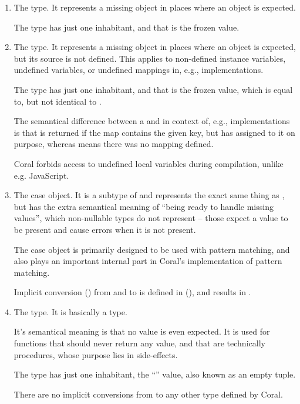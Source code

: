\begin{enumerate}
  \item The  type. It represents a missing object in places where an object is expected. 
  
  The type has just one inhabitant, and that is the frozen  value. 
  
  \item The  type. It represents a missing object in places where an object is expected, but its source is not defined. This applies to non-defined instance variables, undefined variables, or undefined mappings in, e.g.,  implementations. 
  
  The type has just one inhabitant, and that is the frozen  value, which is equal to, but not identical to . 
  
  The semantical difference between a  and  in context of, e.g.,  implementations is that  is returned if the map contains the given key, but has  assigned to it on purpose, whereas  means there was no mapping defined. 
  
  Coral forbids access to undefined local variables during compilation, unlike e.g. JavaScript. 
  
  \item The  case object. It is a subtype of  and represents the exact same thing as , but has the extra semantical meaning of ``being ready to handle missing values'', which non-nullable types do not represent -- those expect a value to be present and cause errors when it is not present. 
  
  The  case object is primarily designed to be used with pattern matching, and also plays an important internal part in Coral's implementation of pattern matching. 
  
  Implicit conversion () from  and  to  is defined in  (), and results in . 
  
  \item The  type. It is basically a  type. 
  
  It's semantical meaning is that no value is even expected. It is used for functions that should never return any value, and that are technically procedures, whose purpose lies in side-effects. 
  
  The type has just one inhabitant, the ``\code{()}'' value, also known as an empty tuple. 
  
  There are no implicit conversions from  to any other type defined by Coral. 
\end{enumerate}

